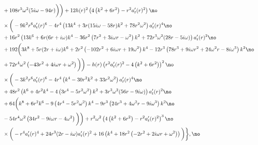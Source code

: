 \documentclass[preprintnumbers,aps,prd,longbibliography,nofootinbib,nobibnotes,amsmath,amssymb]{revtex4}
\begin{document}
\begin{align}
		&+108 r^5 \omega ^2 (5 i \omega -94 r)\bigg)\bigg) +12 h(r)^2 \left(4 \left(k^2+6 r^2\right)-r^2 a_t'(r){}^2\right) \no\\
		&\times \bigg(-9 k^2 r^6 a_t'(r){}^6-4 r^4 \left(13 k^4+3 r (15 i \omega -58 r) k^2+78 r^2 \omega ^2\right) a_t'(r)^4\no\\
		&+16 r^2 \left(13 k^6+6 r (6 r+i \omega ) k^4-36 r^2 \left(7 r^2+3 i \omega  r-\omega ^2\right) k^2+72 r^3 \omega ^2 (28 r-5 i \omega )\right) a_t'(r)^2\no\\
		&+192 \bigg(3 k^8+5 r (2 r+i \omega ) k^6+2 r^2 \left(-102 r^2+6 i \omega  r+19 \omega ^2\right) k^4-12 r^3 \left(78 r^3+9 i \omega  r^2+24 \omega ^2 r-8 i \omega ^3\right) k^2\no\\
		&+72 r^4 \omega ^2 \left(-43 r^2+4 i \omega  r+\omega ^2\right)\bigg)\bigg) -h(r) \left(r^2 a_t'(r)^2-4 \left(k^2+6 r^2\right)\right)^2 \no\\
		&\times \bigg(-3 k^2 r^6 a_t'(r){}^6-4 r^4 \left(k^4-30 r^2 k^2+33 r^2 \omega ^2\right) a_t'(r)^4\no\\
		&+48 r^2 \left(k^6+4 r^2 k^4-4 \left(3 r^4-5 r^2 \omega ^2\right) k^2+3 r^3 \omega ^2 (56 r-9 i \omega )\right) a_t'(r)^2\no\\
		&+64 \bigg(k^8+6 r^2 k^6-9 \left(4 r^4-5 r^2 \omega ^2\right) k^4-9 r^3 \left(24 r^3+4 \omega ^2 r-9 i \omega ^3\right) k^2\no\\
		&-54 r^4 \omega ^2 \left(34 r^2-9 i \omega  r-4 \omega ^2\right)\bigg)\bigg) +r^2 \omega ^2 \left(4 \left(k^2+6 r^2\right)-r^2 a_t'(r)^2\right)^3 \no\\
		&\times \bigg(-r^4 a_t'(r){}^4+24 r^3 (2 r-i \omega ) a_t'(r){}^2+16 \left(k^4+18 r^2 \left(-2 r^2+2 i \omega  r+\omega ^2\right)\right)\bigg)\bigg\},\no
		\end{align}
\end{document}
